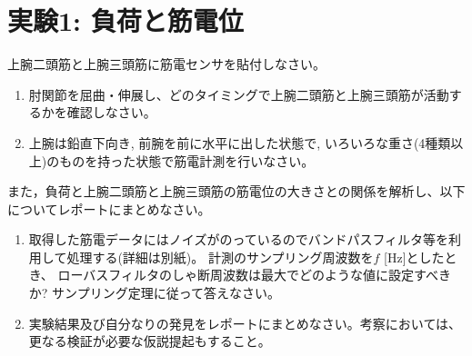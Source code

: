\documentclass{jsarticle}
\begin{document}


\section{実験1: 負荷と筋電位}
上腕二頭筋と上腕三頭筋に筋電センサを貼付しなさい。

\begin{enumerate}
  \item 肘関節を屈曲・伸展し、どのタイミングで上腕二頭筋と上腕三頭筋が活動するかを確認しなさい。
  \item 上腕は鉛直下向き, 前腕を前に水平に出した状態で, いろいろな重さ(4種類以上)のものを持った状態で筋電計測を行いなさい。 
\end{enumerate}

また，負荷と上腕二頭筋と上腕三頭筋の筋電位の大きさとの関係を解析し、以下についてレポートにまとめなさい。

\begin{enumerate}
  \item 取得した筋電データにはノイズがのっているのでバンドパスフィルタ等を利用して処理する(詳細は別紙)。
  計測のサンプリング周波数を$f$ [Hz]としたとき、
  ローバスフィルタのしゃ断周波数は最大でどのような値に設定すべきか? 
  サンプリング定理に従って答えなさい。
  \item 実験結果及び自分なりの発見をレポートにまとめなさい。考察においては、更なる検証が必要な仮説提起もすること。
\end{enumerate}
\end{document}
